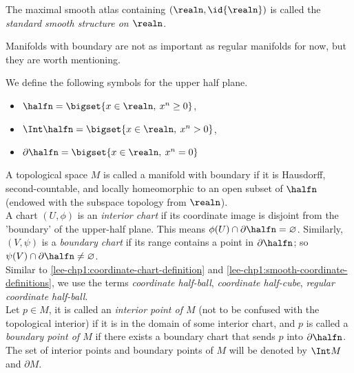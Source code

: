 \documentclass[../main-v2-manifolds.tex]{subfiles}
\begin{document}
\begin{definition}\label{lee-chp1:standard-smooth-structure-realn}
    The maximal smooth atlas containing $(\realn,\id{\realn})$ is called the \emph{standard smooth structure on $\realn$}.
\end{definition}

Manifolds with boundary are not as important as regular manifolds for now, but they are worth mentioning.
\begin{definition}\label{lee-chp1:upper-half-plane-definitions}
    We define the following symbols for the upper half plane.
    \begin{itemize}
        \item $\halfn = \bigset{x\in\realn,\: x^n\geq 0}$,
        \item $\Int\halfn = \bigset{x\in\realn,\: x^n > 0}$,
        \item $\partial\halfn = \bigset{x\in\realn,\: x^n = 0}$
    \end{itemize}
\end{definition}
\begin{definition}\label{lee-chp1:manifolds-with-boundary-definition}
    A topological space $M$ is called a manifold with boundary if it is Hausdorff, second-countable, and locally homeomorphic to an open subset of $\halfn$ (endowed with the subspace topology from $\realn$).\\

    A chart $(U,\phi)$ is an \emph{interior chart} if its coordinate image is disjoint from the 'boundary' of the upper-half plane. This means $\phi(U)\cap \partial\halfn=\varnothing$. Similarly, $(V,\psi)$ is a \emph{boundary chart} if its range contains a point in $\partial\halfn$; so $\psi(V)\cap\partial\halfn\neq\varnothing$.\\

    Similar to \cref{lee-chp1:coordinate-chart-definition} and \cref{lee-chp1:smooth-coordinate-definitions}, we use the terms \emph{coordinate half-ball}, \emph{coordinate half-cube}, \emph{regular coordinate half-ball}.\\

    Let $p\in M$, it is called an \emph{interior point of $M$} (not to be confused with the topological interior) if it is in the domain of some interior chart, and $p$ is called a \emph{boundary point of $M$} if there exists a boundary chart that sends $p$ into $\partial\halfn$. The set of interior points and boundary points of $M$ will be denoted by $\Int M$ and $\partial M$.
\end{definition}
\end{document}
